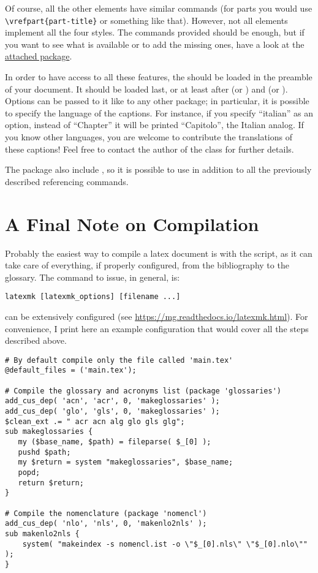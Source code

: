 Of course, all the other elements have similar commands (\eg for parts 
you would use \lstinline|\vrefpart{part-title}| or something like that). 
However, not all elements implement all the four styles. The commands 
provided should be enough, but if you want to see what is available or 
to add the missing ones, have a look at the 
\href{styles/kaorefs.sty}{attached package}.

In order to have access to all these features, the  
should be loaded in the preamble of your document. It should be loaded 
last, or at least after  (or ) and 
 (or ). Options can be 
passed to it like to any other package; in particular, it is possible to 
specify the language of the captions. For instance, if you specify 
\enquote{italian} as an option, instead of \enquote{Chapter} it will be 
printed \enquote{Capitolo}, the Italian analog. If you know other 
languages, you are welcome to contribute the translations of these 
captions! Feel free to contact the author of the class for further 
details. 

The  package also include , so it is 
possible to use  in addition to all the previously 
described referencing commands.

\section{A Final Note on Compilation}

Probably the easiest way to compile a latex document is with the 
 script, as it can take care of everything, if properly 
configured, from the bibliography to the glossary. The command to issue, 
in general, is:

\begin{lstlisting}
latexmk [latexmk_options] [filename ...]
\end{lstlisting}

 can be extensively configured (see
\url{https://mg.readthedocs.io/latexmk.html}). For convenience, I print 
here an example configuration that would cover all the steps described 
above.

\begin{lstlisting}
# By default compile only the file called 'main.tex'
@default_files = ('main.tex');

# Compile the glossary and acronyms list (package 'glossaries')
add_cus_dep( 'acn', 'acr', 0, 'makeglossaries' );
add_cus_dep( 'glo', 'gls', 0, 'makeglossaries' );
$clean_ext .= " acr acn alg glo gls glg";
sub makeglossaries {
   my ($base_name, $path) = fileparse( $_[0] );
   pushd $path;
   my $return = system "makeglossaries", $base_name;
   popd;
   return $return;
}

# Compile the nomenclature (package 'nomencl')
add_cus_dep( 'nlo', 'nls', 0, 'makenlo2nls' );
sub makenlo2nls {
    system( "makeindex -s nomencl.ist -o \"$_[0].nls\" \"$_[0].nlo\"" );
}
\end{lstlisting}

